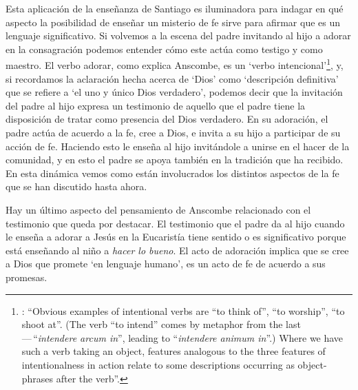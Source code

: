 Esta aplicación de la enseñanza de Santiago es iluminadora para indagar en qué aspecto la posibilidad de enseñar un misterio de fe sirve para afirmar que es un lenguaje significativo. Si volvemos a la escena del padre invitando al hijo a adorar en la consagración podemos entender cómo este actúa como testigo y como maestro. El verbo adorar, como explica Anscombe, es un `verbo intencional'\footnote{\cite[4-5]{anscombe1981metaphysics:intsens}: \enquote{Obvious examples of intentional verbs are ``to think of'', ``to worship'', ``to shoot at''. (The verb ``to intend'' comes by metaphor from the last\,---\,``\emph{intendere arcum in}'', leading to ``\emph{intendere animum in}''.) Where we have such a verb taking an object, features analogous to the three features of intentionalness in action relate to some descriptions occurring as object-phrases after the verb}.}, y, si recordamos la aclaración hecha acerca de `Dios' como `descripción definitiva' que se refiere a `el uno y único Dios verdadero', podemos decir que la invitación del padre al hijo expresa un testimonio de aquello que el padre tiene la disposición de tratar como presencia del Dios verdadero. En su adoración, el padre actúa de acuerdo a la fe, cree a Dios, e invita a su hijo a participar de su acción de fe. Haciendo esto le enseña al hijo invitándole a unirse en el hacer de la comunidad, y en esto el padre se apoya también en la tradición que ha recibido. En esta dinámica vemos como están involucrados los distintos aspectos de la fe que se han discutido hasta ahora.

Hay un último aspecto del pensamiento de Anscombe relacionado con el testimonio que queda por destacar. El testimonio que el padre da al hijo cuando le enseña a adorar a Jesús en la Eucaristía tiene sentido o es significativo porque está enseñando al niño a \emph{hacer lo bueno}. El acto de adoración implica que se cree a Dios que promete \enquote*{en lenguaje humano}, es un acto de fe de acuerdo a sus promesas.

